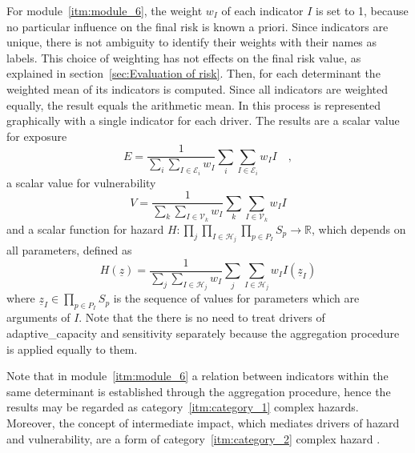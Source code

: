 For module~\ref{itm:module_6}, the weight $w_I$ of each \gls{indicator} $I$ is set to 1, because no particular influence on the final \gls{risk} is known a priori. Since \glspl{indicator} are unique, there is not ambiguity to identify their weights with their names as labels. This choice of weighting has not effects on the final \gls{risk} value, as explained in section~\ref{sec:Evaluation of risk}.
Then, for each \gls{determinant} the weighted mean of its \glspl{indicator} is computed. Since all \glspl{indicator} are weighted equally, the result equals the arithmetic mean. In \cite[51]{2017GIZRiskSupplement} this process is represented graphically with a single \gls{indicator} for each \gls{driver}.
The results are a scalar value for \gls{exposure}
\begin{equation}
  \label{eq:exposure_aggregated}
  E = \frac{1}{\sum_i \sum_{I \in \mathcal{E}_i} w_I} \sum_i \sum_{I \in \mathcal{E}_i} w_I I
  \quad ,
\end{equation}
a scalar value for \gls{vulnerability}
\begin{equation}
  \label{eq:vulnerability_aggregated}
  V = \frac{1}{\sum_k \sum_{I \in \mathcal{V}_k} w_I} \sum_k \sum_{I \in \mathcal{V}_k} w_I I
\end{equation}
and a scalar function for \gls{hazard} $H : \prod_j \prod_{I \in \mathcal{H}_j} \prod_{p \in P_I} S_p \to \mathbb{R}$, which depends on all parameters, defined as
\begin{equation}
  \label{eq:hazard_aggregated}
  H(\underline{z}) = \frac{1}{\sum_j \sum_{I \in \mathcal{H}_j} w_I} \sum_j \sum_{I \in \mathcal{H}_j} w_I I(\underline{z}_I)
\end{equation}
where $\underline{z}_I \in \prod_{p \in P_I} S_p$ is the sequence of values for parameters which are arguments of $I$.
Note that the there is no need to treat \glspl{driver} of \gls{adaptive_capacity} and \gls{sensitivity} separately because the aggregation procedure is applied equally to them.

Note that in module~\ref{itm:module_6} a relation between \glspl{indicator} within the same \gls{determinant} is established through the aggregation procedure, hence the results may be regarded as category~\ref{itm:category_1} complex \glspl{hazard}.
Moreover, the concept of intermediate impact, which mediates \glspl{driver} of hazard and \gls{vulnerability}, are a form of category~\ref{itm:category_2} complex \gls{hazard} \cite[33]{2017GIZRiskSupplement}.



